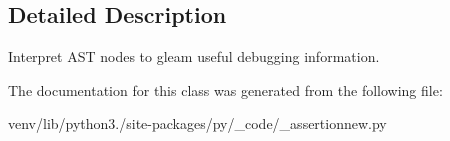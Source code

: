 \subsection{Detailed Description}
\begin{DoxyVerb}Interpret AST nodes to gleam useful debugging information. \end{DoxyVerb}
 

The documentation for this class was generated from the following file\+:\begin{DoxyCompactItemize}
\item 
venv/lib/python3./site-\/packages/py/\+\_\+code/\+\_\+assertionnew.\+py\end{DoxyCompactItemize}

